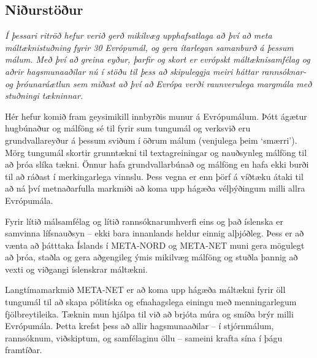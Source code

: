 \documentclass{../../metanetpaper}
\begin{document}
\begin{multicols}{2}
\subsection{Niðurstöður}

\emph{Í þessari ritröð hefur verið gerð mikilvæg upphafsatlaga að því að meta máltæknistuðning fyrir 30 Evrópumál, og gera ítarlegan samanburð á þessum málum. Með því að greina eyður, þarfir og skort er evrópskt máltæknisamfélag og aðrir hagsmunaaðilar nú í stöðu til þess að skipuleggja meiri háttar rannsóknar- og þróunaráætlun sem miðast að því að Evrópa verði raunverulega margmála með stuðningi tækninnar.}

Hér hefur komið fram geysimikill innbyrðis munur á Evrópumálum. Þótt ágætur hugbúnaður og málföng sé til fyrir sum tungumál og verksvið eru grundvallareyður á þessum sviðum í öðrum málum (venjulega þeim ‘smærri’). Mörg tungumál skortir grunntækni til textagreiningar og nauðsynleg málföng til að þróa slíka tækni. Önnur hafa grundvallarbúnað og málföng en hafa ekki burði til að ráðast í merkingarlega vinnslu. Þess vegna er enn þörf á víðtæku átaki til að ná því metnaðarfulla markmiði að koma upp hágæða vélþýðingum milli allra Evrópumála.

Fyrir lítið málsamfélag og lítið rannsóknarumhverfi eins og það íslenska er samvinna lífsnauðsyn -- ekki bara innanlands heldur einnig alþjóðleg. Þess er að vænta að þátttaka Íslands í META-NORD og META-NET muni gera mögulegt að þróa, staðla og gera aðgengileg ýmis mikilvæg málföng og stuðla þannig að vexti og viðgangi íslenskrar máltækni. 

Langtímamarkmið META-NET er að koma upp hágæða máltækni fyrir öll tungumál til að skapa pólitíska og efnahagslega einingu með menningarlegum fjölbreytileika. Tæknin mun hjálpa til við að brjóta múra og smíða brýr milli Evrópumála. Þetta krefst þess að allir hagsmunaaðilar -- í stjórnmálum, rannsóknum, viðskiptum, og samfélaginu öllu -- sameini krafta sína í þágu framtíðar.
\end{multicols}

\clearpage
\end{document}
